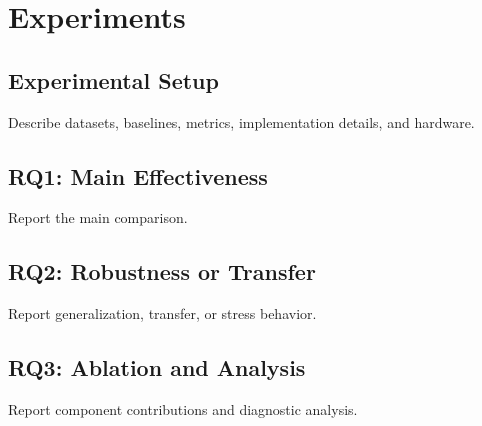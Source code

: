 \section{Experiments}

\subsection{Experimental Setup}

Describe datasets, baselines, metrics, implementation details, and hardware.

\subsection{RQ1: Main Effectiveness}

Report the main comparison.

\subsection{RQ2: Robustness or Transfer}

Report generalization, transfer, or stress behavior.

\subsection{RQ3: Ablation and Analysis}

Report component contributions and diagnostic analysis.

